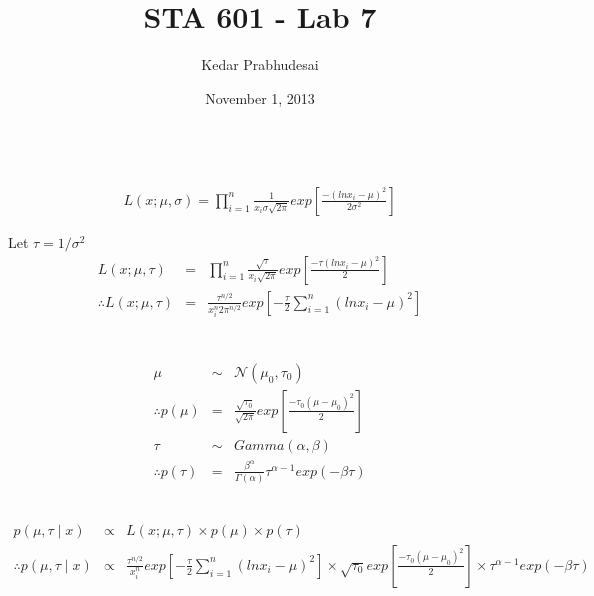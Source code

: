 \documentclass{article}
\title{STA 601 - Lab 7}
\author{Kedar Prabhudesai}
\date{November 1, 2013}
\begin{document}
\maketitle

\\
\begin{eqnarray*}
L(x;\mu,\sigma) = \prod_{i=1}^{n}{\frac{1}{x_i\sigma \sqrt{2\pi}}exp\left[\frac{-(ln x_i-\mu)^2}{2\sigma^2}\right]}
\end{eqnarray*}

Let $\tau = 1/\sigma^2$\\

\begin{eqnarray*}
L(x;\mu,\tau) &=& \prod_{i=1}^{n}{\frac{\sqrt{\tau}}{x_i\sqrt{2\pi}}exp\left[\frac{-\tau(ln x_i-\mu)^2}{2}\right]}\\
\therefore L(x;\mu,\tau) &=& \frac{\tau^{n/2}}{x_i^n2\pi^{n/2}}exp\left[-\frac{\tau}{2}\sum_{i=1}^{n}{(ln x_i-\mu)^2}\right]\\
\end{eqnarray*}

\\
\begin{eqnarray*}
\mu &\sim& \mathcal{N}(\mu_0,\tau_0)\\
\therefore p(\mu) &=& \frac{\sqrt{\tau_0}}{\sqrt{2\pi}}exp\left[\frac{-\tau_0(\mu-\mu_0)^2}{2}\right]\\
\tau &\sim& Gamma(\alpha,\beta)\\
\therefore p(\tau) &=& \frac{\beta^\alpha}{\Gamma(\alpha)}\tau^{\alpha-1}exp(-\beta\tau)
\end{eqnarray*}

\\
\begin{eqnarray*}
p(\mu,\tau \mid x) &\propto& L(x;\mu,\tau) \times p(\mu) \times p(\tau)\\
\therefore p(\mu,\tau \mid x) &\propto& \frac{\tau^{n/2}}{x_i^n}exp\left[-\frac{\tau}{2}\sum_{i=1}^{n}{(ln x_i-\mu)^2}\right] \times \sqrt{\tau_0}exp\left[\frac{-\tau_0(\mu-\mu_0)^2}{2}\right] \times \tau^{\alpha-1}exp(-\beta\tau)
\end{eqnarray*}

\pagebreak
\end{document}

